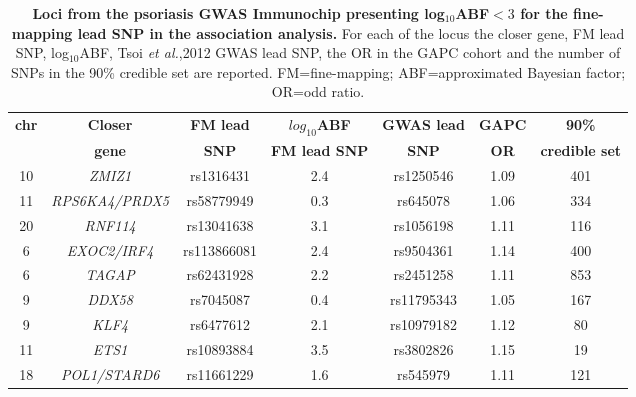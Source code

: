 \begin{landscape}
\begin{center}
\begin{longtable}[ht]{c c c c c c c}
\caption[Loci from the psoriasis GWAS Immunochip presenting log${_10}$ABF$<3$ for the fine-mapping lead SNP in the association analysis.]{\textbf{Loci from the psoriasis GWAS Immunochip presenting log${_10}$ABF$<3$ for the fine-mapping lead SNP in the association analysis.} For each of the locus the closer gene, FM lead SNP, log$_{10}$ABF, Tsoi \textit{et al.},2012 GWAS lead SNP, the OR in the GAPC cohort and the number of SNPs in the 90\% credible set are reported. FM=fine-mapping; ABF=approximated Bayesian factor; OR=odd ratio.}
\label{tab:Psoriasis_loci_no_fine_mapping}\\
\toprule
\textbf{chr} & \textbf{Closer} & \textbf{FM lead} &\textbf{$log_{10}$ABF} & \textbf{GWAS lead}  &  \textbf{GAPC}   & \textbf{90\%} \\
             & \textbf{gene}   & \textbf{SNP}    &\textbf{FM lead SNP}      & \textbf{SNP}        &  \textbf{OR}     & \textbf{credible set} \\
\midrule
\midrule
10 & \textit{ZMIZ1}	        &  rs1316431	&  2.4	& rs1250546	 & 1.09	& 401 \\
11 & \textit{RPS6KA4/PRDX5}	&  rs58779949	&  0.3	& rs645078	 & 1.06	& 334 \\
20 & \textit{RNF114}	        & rs13041638	&  3.1	& rs1056198	 & 1.11	& 116 \\
6	 & \textit{EXOC2/IRF4}	    & rs113866081	&  2.4	& rs9504361	 & 1.14	& 400 \\
6	 & \textit{TAGAP}	        & rs62431928	&  2.2	& rs2451258	 & 1.11	& 853 \\
9	 & \textit{DDX58}	        & rs7045087	  & 0.4	  & rs11795343 & 1.05	& 167 \\
9	 & \textit{KLF4}	          & rs6477612	  & 2.1	  & rs10979182 & 1.12	& 80 \\
11 & \textit{ETS1}	          & rs10893884	& 3.5	  & rs3802826	 & 1.15	& 19 \\
18 & \textit{POL1/STARD6}	  & rs11661229	& 1.6	  & rs545979	 & 1.11	& 121 \\
\bottomrule
\end{longtable}
\end{center}
\end{landscape}




